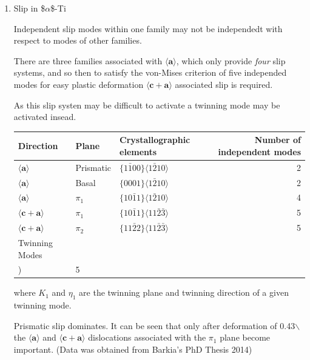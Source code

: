 \documentclass[11pt]{article}
\begin{document}
\begin{enumerate}
\begin{enumerate}
\begin{enumerate}
\#\#\#\#\#\#\#\#\#\#\#\#\#\#\#\#\#\#\#\#

\item Slip in \$\(\alpha\)\$-Ti
\label{sec:org40ae484}

Independent slip modes within one family may not be independedt with respect to modes of other families. 

There are three families associated with \(\langle \mathbf{a} \rangle\), which only provide \emph{four} slip systems, and 
so then to satisfy the von-Mises criterion of five independed modes for easy plastic deformation
 \(\langle \mathbf{c} +  \mathbf{a}\rangle\) associated slip is required.

As this slip systen may be difficult to activate a twinning mode may be activated insead. 

\begin{center}
\begin{tabular}{lllr}
Direction & Plane & Crystallographic elements & Number of independent modes\\
\hline
\(\langle \mathbf{a} \rangle\) & Prismatic & \(\{1\bar{1}00\}  \langle 1\bar{2}10 \rangle\) & 2\\
\(\langle \mathbf{a} \rangle\) & Basal & \(\{0001\}        \langle 1\bar{2}10 \rangle\) & 2\\
\(\langle \mathbf{a} \rangle\) & \(\pi_1\) & \(\{10\bar{1}1\}  \langle 1\bar{2}10 \rangle\) & 4\\
\(\langle \mathbf{c} +  \mathbf{a}\rangle\) & \(\pi_1\) & \(\{10\bar{1}1\}  \langle 11\bar{2}\bar{3} \rangle\) & 5\\
\(\langle \mathbf{c} +  \mathbf{a}\rangle\) & \(\pi_2\) & \(\{11\bar{2}2\}  \langle 11\bar{2}\bar{3} \rangle\) & 5\\
\hline
Twinning Modes &  & \(\{K_1\} \langle \eta_1 \rangle\\) & 5\\
\end{tabular}
\end{center}

where \(K_1\) and \(\eta_1\) are the twinning plane and twinning direction of a given twinning mode. 

Prismatic slip dominates. It can be seen that only after deformation of 0.43$\backslash$%
the \(\langle \mathbf{a} \rangle\) and \(\langle \mathbf{c} +  \mathbf{a}\rangle\) dislocations associated with the \(\pi_1\)
plane become important. (Data was obtained from Barkia's PhD Thesis 2014)


\end{enumerate}
\end{enumerate}
\end{enumerate}
\end{document}
